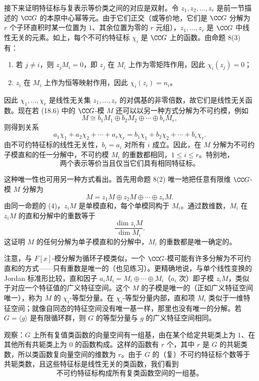 接下来证明特征标与复表示等价类之间的对应是双射。令 $z_1,z_2,
\ldots,z_r$ 是前一节描述的 $\CC G$ 的本原中心幂等元。由于它们正交（或等价地，它们是 $\CC G$ 分解为 $r$ 个子环直积时某一位置为 $1$、其余位置为零的 $r$ 元组），$z_1,
\ldots,z_r$ 是 $\CC G$ 中线性无关的元素。如上，每个不可约特征标 $\chi_i$ 是 $\CC G$ 上的函数。由命题 8(3) 有：
\begin{enumerate}[label=(\alph*)]
  \item 若 $j\neq i$，则 $z_jM_i=0$，即 $z_j$ 在 $M_i$ 上作为零矩阵作用，因此 $\chi_i(z_j)=0$；
  \item $z_i$ 在 $M_i$ 上作为恒等映射作用，因此 $\chi_i(z_i)=n_i$。
\end{enumerate}
因此 $\chi_1,
\ldots,\chi_r$ 是线性无关集 $z_1,
\ldots,z_r$ 的对偶基的非零倍数，故它们是线性无关函数。现在若 (18.6) 中的 $\CC G$-模 $M$ 还可以以另一种方式分解为不可约模，例如
\[
  M\cong b_1M_1\oplus b_2M_2\oplus\cdots\oplus b_rM_r,
\]
则得到关系
\[
  a_1\chi_1+a_2\chi_2+\cdots+a_r\chi_r
  =b_1\chi_1+b_2\chi_2+\cdots+b_r\chi_r.
\]
由不可约特征标的线性无关性，$b_i=a_i$ 对所有 $i$ 成立。因此，在 $M$ 分解为不可约子模直和的任一分解中，不可约模 $M_i$ 的重数都相同，$1\leq i\leq r$。特别地，
\[
  \text{两个表示等价当且仅当它们具有相同特征标。}\tag{18.9}
\]

这种唯一性也可用另一种方式看出。首先用命题 8(2) 唯一地把任意有限维 $\CC G$-模 $M$ 分解为
\[
  M=z_1M\oplus z_2M\oplus\cdots\oplus z_rM.
\]
由同一命题的 (4)，$z_iM$ 是单模直和，每个单模同构于 $M_i$。通过数维数，$M_i$ 在 $z_iM$ 的直和分解中的重数等于
\[
  \frac{\dim z_iM}{\dim M_i}.
\]
这证明 $M$ 的任何分解为单子模直和的分解中，$M_i$ 的重数都是唯一确定的。

注意，与 $F[x]$-模分解为循环子模类似，一个 $\CC G$-模可能有许多分解为不可约直和的方式——只有重数是唯一的（也见练习）。更精确地说，与单个线性变换的 Jordan 标准形比较，直和因子 $a_iM_i=M_i\oplus\cdots\oplus M_i$（$a_i$ 次）即子模 $z_iM$，类似于对应一个特征值的广义特征空间。这个 $M$ 的子模是唯一的（正如广义特征空间唯一），称为 $M$ 的 $\chi_i$-等型分量。在 $\chi_i$-等型分量内部，直和项 $M_i$ 类似于一维特征空间；就像自同态的特征空间没有唯一基一样，那里也没有唯一的分解。若 $G=\langle g\rangle$ 是有限循环群，则 $G$ 的等型分量与 $g$ 的广义特征空间相同。

观察：$G$ 上所有复值类函数的向量空间有一组基，由在某个给定共轭类上为 $1$、在其他所有共轭类上为 $0$ 的函数构成。这样的函数有 $r$ 个，其中 $r$ 是 $G$ 的共轭类数，所以类函数复向量空间的维数为 $r$。由于 $G$ 的（复）不可约特征标个数等于共轭类数，且这些特征标是线性无关的类函数，我们看到
\[
  \text{不可约特征标构成所有复类函数空间的一组基。}\tag{18.10}
\]

